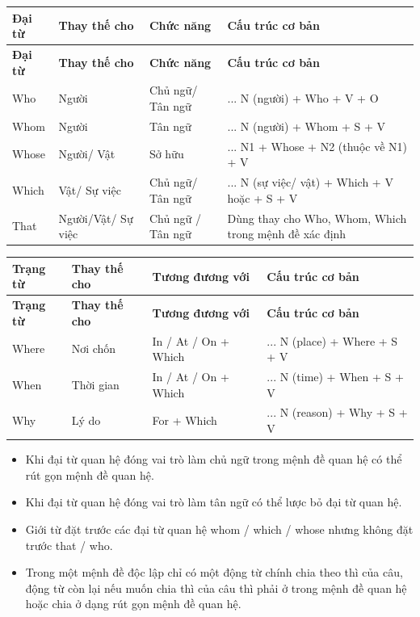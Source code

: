 \documentclass[12pt,a4paper,twoside]{article}
\newcommand{\subheading}[1]{%
    \par\vspace{10pt}%
    \noindent{\color{accentBlue}\Large\textbf{#1}}%
    \par\vspace{6pt}%
}
\begin{document}
{\small
\renewcommand{\arraystretch}{1.25}
\begin{longtable}{|>{\raggedright\arraybackslash}p{}|>{\raggedright\arraybackslash}p{}|>{\raggedright\arraybackslash}p{}|>{\raggedright\arraybackslash}p{}|}
\hline
\rowcolor{pastelBlue}
\textbf{Đại từ} & \textbf{Thay thế cho} & \textbf{Chức năng} & \textbf{Cấu trúc cơ bản} \\
\hline
\endfirsthead
\hline
\rowcolor{pastelBlue}
\textbf{Đại từ} & \textbf{Thay thế cho} & \textbf{Chức năng} & \textbf{Cấu trúc cơ bản} \\
\hline
\endhead
\endfoot
\endlastfoot
Who & Người & Chủ ngữ/ Tân ngữ & ... N (người) + Who + V + O \\
\hline
Whom & Người & Tân ngữ & ... N (người) + Whom + S + V \\
\hline
Whose & Người/ Vật & Sở hữu & ... N1 + Whose + N2 (thuộc về N1) + V \\
\hline
Which & Vật/ Sự việc & Chủ ngữ/ Tân ngữ & ... N (sự việc/ vật) + Which + V hoặc + S + V \\
\hline
That & Người/Vật/ Sự việc & Chủ ngữ / Tân ngữ & Dùng thay cho Who, Whom, Which trong mệnh đề xác định \\
\hline
\end{longtable}
}
{\small
\renewcommand{\arraystretch}{1.25}
\begin{longtable}{|>{\raggedright\arraybackslash}p{}|>{\raggedright\arraybackslash}p{}|>{\raggedright\arraybackslash}p{}|>{\raggedright\arraybackslash}p{}|}
\hline
\rowcolor{pastelBlue}
\textbf{Trạng từ} & \textbf{Thay thế cho} & \textbf{Tương đương với} & \textbf{Cấu trúc cơ bản} \\
\hline
\endfirsthead
\hline
\rowcolor{pastelBlue}
\textbf{Trạng từ} & \textbf{Thay thế cho} & \textbf{Tương đương với} & \textbf{Cấu trúc cơ bản} \\
\hline
\endhead
\endfoot
\endlastfoot
Where & Nơi chốn & In / At / On + Which & ... N (place) + Where + S + V \\
\hline
When & Thời gian & In / At / On + Which & ... N (time) + When + S + V \\
\hline
Why & Lý do & For + Which & ... N (reason) + Why + S + V \\
\hline
\end{longtable}
}
\subheading{3. Lưu ý}
\begin{itemize}[leftmargin=*, itemsep=5pt, label=\textcolor{primaryBlue}{\textbullet}]
\item Khi đại từ quan hệ đóng vai trò làm chủ ngữ trong mệnh đề quan hệ  có thể rút gọn mệnh đề quan hệ.
\item Khi đại từ quan hệ đóng vai trò làm tân ngữ  có thể lược bỏ đại từ quan hệ.
\item Giới từ đặt trước các đại từ quan hệ whom / which / whose nhưng không đặt trước that / who.
\item Trong một mệnh đề độc lập chỉ có một động từ chính chia theo thì của câu, động từ còn lại nếu muốn chia thì của câu thì phải ở trong mệnh đề quan hệ hoặc chia ở dạng rút gọn mệnh đề quan hệ.
\end{itemize}
\end{document}
